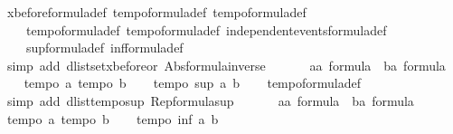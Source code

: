 \begin{isabellebody}
\ xbefore{\isacharunderscore}formula{\isacharunderscore}def\ tempo{}{\isacharunderscore}formula{\isacharunderscore}def\ tempo{}{\isacharunderscore}formula{\isacharunderscore}def\ \isanewline
\ \ \ \ tempo{}{\isacharunderscore}formula{\isacharunderscore}def\ tempo{}{\isacharunderscore}formula{\isacharunderscore}def\ independent{\isacharunderscore}events{\isacharunderscore}formula{\isacharunderscore}def\ \isanewline
\ \ \ \ sup{\isacharunderscore}formula{\isacharunderscore}def\ inf{\isacharunderscore}formula{\isacharunderscore}def\isanewline
\ \ \isamarkupfalse%
\ {\isacharparenleft}simp\ add{\isacharcolon}\ dlistset{\isacharunderscore}xbefore{\isacharunderscore}or\ Abs{\isacharunderscore}formula{\isacharunderscore}inverse{\isacharparenright}\isanewline
\ \ \isamarkupfalse%
\isanewline
\ \ \isamarkupfalse%
\ a{\isacharcolon}{\isacharcolon}{\isachardoublequoteopen}{\isacharprime}a\ formula{\isachardoublequoteclose}\ \ b{\isacharcolon}{\isacharcolon}{\isachardoublequoteopen}{\isacharprime}a\ formula{\isachardoublequoteclose}\isanewline
\ \ \isamarkupfalse%
\ {\isachardoublequoteopen}tempo{}\ a{\isachardoublequoteclose}\ {\isachardoublequoteopen}tempo{}\ b{\isachardoublequoteclose}\isanewline
\ \ \isamarkupfalse%
\ {\isachardoublequoteopen}tempo{}\ {\isacharparenleft}sup\ a\ b{\isacharparenright}{\isachardoublequoteclose}\isanewline
\ \ \isamarkupfalse%
\ tempo{}{\isacharunderscore}formula{\isacharunderscore}def\ \isanewline
\ \ \isamarkupfalse%
\ {\isacharparenleft}simp\ add{\isacharcolon}\ dlist{\isacharunderscore}tempo{}{\isacharunderscore}sup\ Rep{\isacharunderscore}formula{\isacharunderscore}sup{\isacharparenright}\isanewline
\ \ \isamarkupfalse%
\isanewline
\ \ \isamarkupfalse%
\ a{\isacharcolon}{\isacharcolon}{\isachardoublequoteopen}{\isacharprime}a\ formula{\isachardoublequoteclose}\ \ b{\isacharcolon}{\isacharcolon}{\isachardoublequoteopen}{\isacharprime}a\ formula{\isachardoublequoteclose}\isanewline
\ \ \isamarkupfalse%
\ {\isachardoublequoteopen}tempo{}\ a{\isachardoublequoteclose}\ {\isachardoublequoteopen}tempo{}\ b{\isachardoublequoteclose}\isanewline
\ \ \isamarkupfalse%
\ {\isachardoublequoteopen}tempo{}\ {\isacharparenleft}inf\ a\ b{\isacharparenright}{\isachardoublequoteclose}\isanewline

\end{isabellebody}

